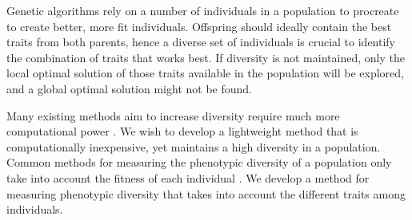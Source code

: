 Genetic algorithms rely on a number of individuals in a population to procreate to create better, more fit individuals. Offspring should ideally contain the best traits from both parents, hence a diverse set of individuals is crucial to identify the combination of traits that works best. If diversity is not maintained, only the local optimal solution of those traits available in the population will be explored, and a global optimal solution might not be found.
\cite{ursem2002diversity}

Many existing methods aim to increase diversity require much more computational power \citpls{}. We wish to develop a lightweight method that is computationally inexpensive, yet maintains a high diversity in a population. Common methods for measuring the phenotypic diversity of a population only take into account the fitness of each individual \citpls{}. We develop a method for measuring phenotypic diversity that takes into account the different traits among individuals.
